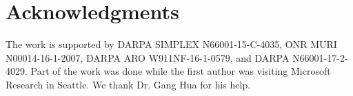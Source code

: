 \documentclass{article}
\begin{document}
\section*{Acknowledgments}

The work is supported by DARPA SIMPLEX N66001-15-C-4035,  ONR MURI N00014-16-1-2007, DARPA ARO W911NF-16-1-0579, and DARPA  N66001-17-2-4029. Part of the work was done while the first author was visiting Microsoft Research in Seattle. We thank Dr. Gang Hua for his help. 



\end{document}
